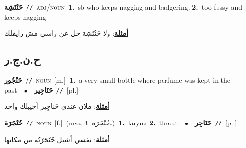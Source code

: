 \documentclass[10pt,a4paper,twoside]{article} %
\begin{document}
\begin{multicols}{2}
{\setlength\topsep{0pt}\textbf{\foreignlanguage{arabic}{حَنْتَشِة}}\ {\color{gray}\texttt{//}\color{black}}\ \textsc{adj/noun}\ \textbf{1.}~sb who keeps nagging and badgering.  \textbf{2.}~too fussy and keeps nagging\  \begin{flushright}\color{gray}\foreignlanguage{arabic}{\textbf{\underline{\foreignlanguage{arabic}{أمثلة}}}: ولا حَنْتَشِة حل عن راسي مش رايقلك}\end{flushright}\color{black}} \vspace{2mm}

\vspace{-3mm}
\subsection*{\color{blue}\foreignlanguage{arabic}{ح.ن.ج.ر}\color{blue}{}} 

{\setlength\topsep{0pt}\textbf{\foreignlanguage{arabic}{حَنْجُور}}\ {\color{gray}\texttt{//}\color{black}}\ \textsc{noun}\ [m.]\ \textbf{1.}~a very small bottle where perfume was kept in the past\ \ $\bullet$\ \ \setlength\topsep{0pt}\textbf{\foreignlanguage{arabic}{حَنَاجِير}}\ {\color{gray}\texttt{//}\color{black}}\ [pl.]\  \begin{flushright}\color{gray}\foreignlanguage{arabic}{\textbf{\underline{\foreignlanguage{arabic}{أمثلة}}}: ملان عندي حَناجِير أجيبلك واحد}\end{flushright}\color{black}} \vspace{2mm}

{\setlength\topsep{0pt}\textbf{\foreignlanguage{arabic}{حُنْجَرَة}}\ {\color{gray}\texttt{//}\color{black}}\ \textsc{noun}\ [f.]\ \color{gray}(msa. \foreignlanguage{arabic}{حُنْجَرَة}~\foreignlanguage{arabic}{\textbf{١.}})\color{black}\ \textbf{1.}~larynx  \textbf{2.}~throat\ \ $\bullet$\ \ \setlength\topsep{0pt}\textbf{\foreignlanguage{arabic}{حَنَاجِر}}\ {\color{gray}\texttt{//}\color{black}}\ [pl.]\  \begin{flushright}\color{gray}\foreignlanguage{arabic}{\textbf{\underline{\foreignlanguage{arabic}{أمثلة}}}: نفسي أشيل حُنْجَرْتُه من مكانها}\end{flushright}\color{black}} \vspace{2mm}


\end{multicols}
\end{document}
